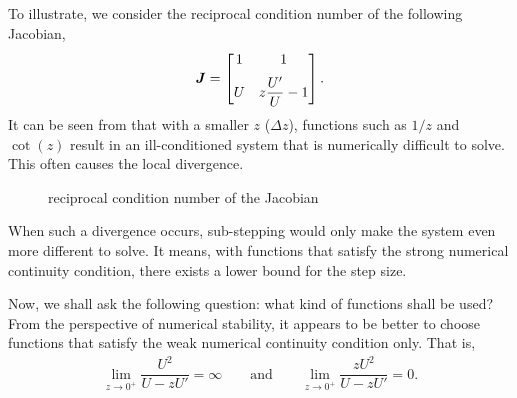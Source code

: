 To illustrate, we consider the reciprocal condition number of the following Jacobian,
\begin{gather}
    \bm{J}=\begin{bmatrix}
        1 & 1                \\[2mm]
        U & z\dfrac{U'}{U}-1
    \end{bmatrix}.
\end{gather}
It can be seen from  that with a smaller $z$ ($\Delta{}z$), functions such as $1/z$ and $\cot\left(z\right)$ result in an ill-conditioned system that is numerically difficult to solve.
This often causes the local divergence.
\begin{figure}
    \centering\footnotesize
    \caption{reciprocal condition number of the Jacobian}\label{fig:rcond}
\end{figure}
When such a divergence occurs, sub-stepping would only make the system even more different to solve.
It means, with functions that satisfy the strong numerical continuity condition, there exists a lower bound for the step size.

Now, we shall ask the following question: what kind of functions shall be used?
From the perspective of numerical stability, it appears to be better to choose functions that satisfy the weak numerical continuity condition only.
That is,
\begin{gather}
    \lim\limits_{z\to0^+}\dfrac{U^2}{U-zU'}=\infty\qquad\text{and}\qquad\lim\limits_{z\to0^+}\dfrac{zU^2}{U-zU'}=0.
\end{gather}


